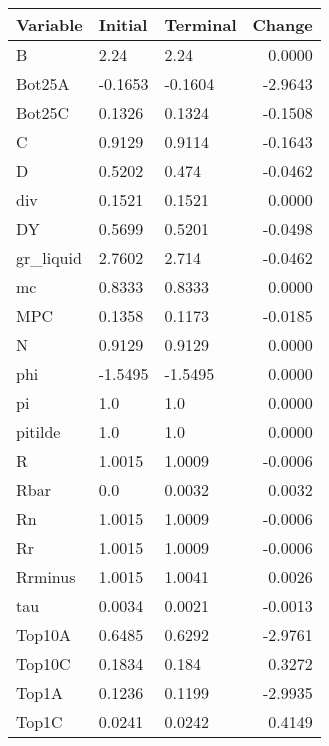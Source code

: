 \begin{table}
\centering
\label{tab:stst_comparison_low_B_wedge_permanent}
\begin{tabular}{lllr}
\toprule
                Variable & Initial & Terminal &  Change \\
\midrule
                       B &    2.24 &     2.24 &  0.0000 \\
                  Bot25A & -0.1653 &  -0.1604 & -2.9643 \\
                  Bot25C &  0.1326 &   0.1324 & -0.1508 \\
                       C &  0.9129 &   0.9114 & -0.1643 \\
                       D &  0.5202 &    0.474 & -0.0462 \\
                     div &  0.1521 &   0.1521 &  0.0000 \\
                      DY &  0.5699 &   0.5201 & -0.0498 \\
               gr\_liquid &  2.7602 &    2.714 & -0.0462 \\
                      mc &  0.8333 &   0.8333 &  0.0000 \\
                     MPC &  0.1358 &   0.1173 & -0.0185 \\
                       N &  0.9129 &   0.9129 &  0.0000 \\
                     phi & -1.5495 &  -1.5495 &  0.0000 \\
                      pi &     1.0 &      1.0 &  0.0000 \\
                 pitilde &     1.0 &      1.0 &  0.0000 \\
                       R &  1.0015 &   1.0009 & -0.0006 \\
                    Rbar &     0.0 &   0.0032 &  0.0032 \\
                      Rn &  1.0015 &   1.0009 & -0.0006 \\
                      Rr &  1.0015 &   1.0009 & -0.0006 \\
                 Rrminus &  1.0015 &   1.0041 &  0.0026 \\
                     tau &  0.0034 &   0.0021 & -0.0013 \\
                  Top10A &  0.6485 &   0.6292 & -2.9761 \\
                  Top10C &  0.1834 &    0.184 &  0.3272 \\
                   Top1A &  0.1236 &   0.1199 & -2.9935 \\
                   Top1C &  0.0241 &   0.0242 &  0.4149 \\

\end{tabular}
\end{table}
